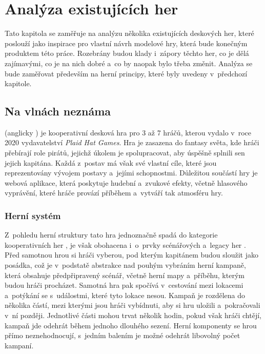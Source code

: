 \chapter{Analýza existujících her}
\label{chap:game_analysis}

Tato kapitola se zaměřuje na analýzu několika existujících deskových her, které poslouží jako inspirace pro vlastní návrh modelové hry, která bude konečným produktem této práce. Rozebrány budou klady i~zápory těchto her, co je dělá zajímavými, co je na nich dobré a~co by naopak bylo třeba změnit. Analýza se bude zaměřovat především na herní principy, které byly uvedeny v~předchozí kapitole.



\section{Na vlnách neznáma}
\label{sec:forgotten_waters}

 (anglicky ) je kooperativní desková hra pro 3 až 7 hráčů, kterou vydalo v~roce 2020 vydavatelství \textit{Plaid Hat Games}. Hra je zasazena do fantasy světa, kde hráči přebírají role pirátů, jejichž úkolem je spolupracovat, aby úspěšně splnili sen jejich kapitána. Každá z~postav má však své vlastní cíle, které jsou reprezentovány vývojem postavy a~jejími schopnostmi. Důležitou součástí hry je webová aplikace, která poskytuje hudební a~zvukové efekty, včetně hlasového vyprávění, které hráče provází příběhem a~vytváří tak atmosféru hry. \cite{forgotten_waters}


\subsection{Herní systém}
\label{subsec:fw_gameplay}

Z~pohledu herní struktury tato hra jednoznačně spadá do kategorie kooperativních her , je však obohacena i~o~prvky scénářových  a~legacy her . Před samotnou hrou si hráči vyberou, pod kterým kapitánem budou sloužit jako posádka, což je v~podstatě abstrakce nad pouhým vybráním herní kampaně, která obsahuje předpřipravený scénář, včetně herní mapy a~příběhu, kterým budou hráči procházet. Samotná hra pak spočívá v~cestování mezi lokacemi a~potýkání se s~událostmi, které tyto lokace nesou. Kampaň je rozdělena do několika částí, mezi kterými jsou hráči vybídnuti, aby si hru uložili a~pokračovali v~ní později. Jednotlivé části mohou trvat několik hodin, pokud však hráči chtějí, kampaň jde odehrát během jednoho dlouhého sezení. Herní komponenty se hrou přímo neznehodnocují, s~jedním balením je možné odehrát libovolný počet kampaní.


